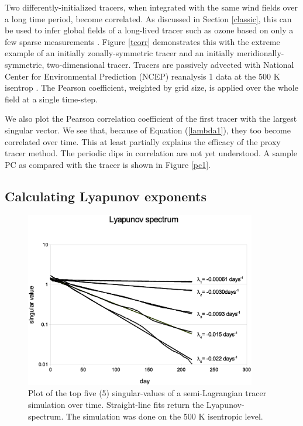 Two differently-initialized tracers, when integrated with the same
wind fields over a long time period, become correlated.
As discussed in Section \ref{classic},
this can be used to infer global fields of a long-lived tracer such as
ozone based on only a few sparse measurements 
\citep{Allen_Nakamura2003,Randall_etal2002}.
Figure \ref{tcorr} demonstrates this with the extreme example of an initially
zonally-symmetric tracer and an initially meridionally-symmetric,
two-dimensional tracer.
Tracers are passively advected with National Center for Environmental Prediction
(NCEP) reanalysis 1 data at the 500 K isentrop \citep{Kalnay_etal1996}.
The Pearson coefficient, weighted by grid size, is applied over the whole field at a single time-step.

We also plot the Pearson correlation coefficient of the first tracer with the largest singular
vector.  
We see that, because of Equation (\ref{lambda1}), they too become
correlated over time.
This at least partially explains the efficacy of the proxy tracer method.
The periodic dips in correlation are not yet understood.
A sample PC as compared with the tracer is shown in Figure \ref{pc1}.  

\subsection{Calculating Lyapunov exponents}

\label{Lyapunov_exponents}

\begin{figure}
\begin{center}
\includegraphics[width=0.9\textwidth]{lyap_spec}
\caption{Plot of the top five (5) singular-values of a semi-Lagrangian
tracer simulation over time.  Straight-line fits return the Lyapunov-spectrum.
The simulation was done on the 500 K isentropic level.}
\label{lyap_spec}
\end{center}
\end{figure}

